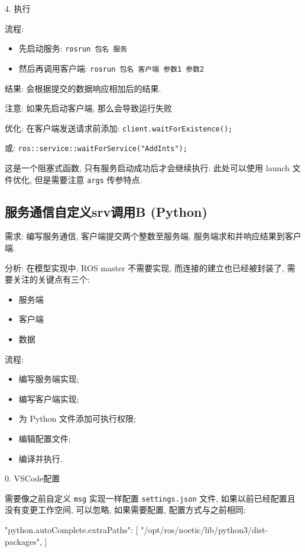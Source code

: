 \documentclass[openany, fontset=windowsold]{ctexbook}
\theoremstyle{kaiti}
\theoremstyle{normal}
\begin{document}
4. 执行

流程:

\begin{itemize}
  \item 先启动服务: \verb|rosrun 包名 服务|
  \item 然后再调用客户端: \verb|rosrun 包名 客户端 参数1 参数2|
\end{itemize}

结果: 会根据提交的数据响应相加后的结果.

注意: 如果先启动客户端, 那么会导致运行失败

优化: 在客户端发送请求前添加: \verb|client.waitForExistence();|

或: \verb|ros::service::waitForService("AddInts");|

这是一个阻塞式函数, 只有服务启动成功后才会继续执行. 此处可以使用 launch 文件优化, 但是需要注意 \verb|args| 传参特点.

\subsection{服务通信自定义srv调用B (Python)}

需求: 编写服务通信, 客户端提交两个整数至服务端, 服务端求和并响应结果到客户端.

分析: 在模型实现中, ROS master 不需要实现, 而连接的建立也已经被封装了, 需要关注的关键点有三个:

\begin{itemize}
  \item 服务端
  \item 客户端
  \item 数据
\end{itemize}

流程:

\begin{itemize}
  \item 编写服务端实现; 
  \item 编写客户端实现; 
  \item 为 Python 文件添加可执行权限; 
  \item 编辑配置文件; 
  \item 编译并执行.
\end{itemize}

0. VSCode配置

需要像之前自定义 \verb|msg| 实现一样配置 \verb|settings.json| 文件, 如果以前已经配置且没有变更工作空间, 可以忽略, 如果需要配置, 配置方式与之前相同:

\begin{xml}
  {
      "python.autoComplete.extraPaths": [
          "/opt/ros/noetic/lib/python3/dist-packages",
      ]
  }
\end{xml}
\end{document}
